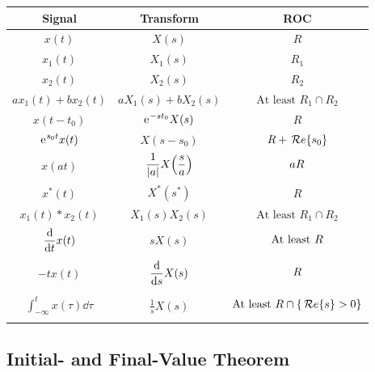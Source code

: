 \documentclass[10pt,UTF8]{article}
\makeatletter
\newenvironment{definition box}
{\begin{tcolorbox}[colback=blue!5!white,colframe=blue!75!black,parbox=false,before upper=\par,before lower=\par]}
{\end{tcolorbox}}
\newenvironment{theorem box}
{\begin{tcolorbox}[colback=yellow!5!white,colframe=yellow!75!black,parbox=false,before upper=\par,before lower=\par]}
{\end{tcolorbox}}
\theoremstyle{definition}
\newtheorem{definition inner}{Definition}[section]
\theoremstyle{plain}
\newtheorem{theorem inner}{Theorem}[section]
\theoremstyle{definition}
\newtheorem*{proof inner}{\textit{Proof}}
\theoremstyle{remark}
\newcommand{\mycases}[2][0.8]{
    \left\{\vphantom{\scalebox{#1}{
        $\begin{matrix}#2\end{matrix}$
    }}\right.\!\!\!\!
    \begin{array}{l@{\quad}l}#2\end{array}
}
\newcommand{\e}{\mathrm{e}{\mkern 1 mu}}
\renewcommand{\Re}{\,\mathcal{R}\ensuremath{e}\qty}
\makeatother
\begin{document}
\begin{center}
\begin{tabular}
    { c @{\qquad} c @{\qquad} c}
    Signal & Transform & ROC \\
    \hline $\displaystyle
    x(t)
    $ & $\displaystyle
    X(s)
    $ & $
    R
    $ \\\hline $
    x_1(t)
    $ & $\displaystyle
    X_1(s)
    $ & $
    R_1
    $ \\\hline $
    x_2(t)
    $ & $\displaystyle
    X_2(s)
    $ & $
    R_2
    $ \\\hline $
    a x_1(t) + b x_2(t)
    $ & $\displaystyle
    a X_1(s) + b X_2(s)
    $ & $
    \text{At least } R_1 \cap R_2
    $ \\\hline $
    x(t-t_0)
    $ & $\displaystyle
    \e^{-s t_0} X(s)
    $ & $
    R
    $ \\\hline $\displaystyle
    \e^{s_0 t} x(t)
    $ & $\displaystyle
    X(s-s_0)
    $ & $
    R + \Re{s_0}
    $ \\\hline $\displaystyle
    x(a t)
    $ & $\displaystyle
    \frac{1}{\abs{a}} X\qty(\frac{s}{a})
    $ & $
    a R \vphantom{\mycases{1\\1}}
    $ \\\hline $
    x^*(t)
    $ & $\displaystyle
    X^*(s^*)
    $ & $
    R
    $ \\\hline $
    x_1(t) \ast x_2(t)
    $ & $\displaystyle
    X_1(s) X_2(s)
    $ & $
    \text{At least } R_1 \cap R_2
    $ \\\hline $\displaystyle
    \dv{t} x(t)
    $ & $\displaystyle
    s X(s)
    $ & $\displaystyle
    \text{At least } R \vphantom{\mycases{1\\1}}
    $ \\\hline $\displaystyle
    -t x(t)
    $ & $\displaystyle
    \dv{s} X(s)
    $ & $\displaystyle
    R \vphantom{\mycases{1\\1}}
    $ \\\hline $\displaystyle
    \int_{-\infty}^t x(\tau)\dd{\tau}
    $ & $\displaystyle
    \frac{1}{s} X(s)
    $ & $\displaystyle
    \text{At least } R \cap \{\Re{s}>0\} \vphantom{\mycases{1\\1}}
    $ \\\hline
\end{tabular}
\end{center}

\subsection{Initial- and Final-Value Theorem}
\end{document}
